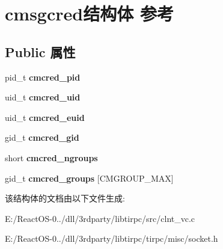 \hypertarget{structcmsgcred}{}\section{cmsgcred结构体 参考}
\label{structcmsgcred}
\subsection*{Public 属性}
\begin{DoxyCompactItemize}
\item 
\mbox{\label{structcmsgcred_a2bc7b741d972a1025be46ea13ea88811}} 
pid\+\_\+t {\bfseries cmcred\+\_\+pid}
\item 
\mbox{\label{structcmsgcred_a8bbd5df071d58f389356023b916c7b9c}} 
uid\+\_\+t {\bfseries cmcred\+\_\+uid}
\item 
\mbox{\label{structcmsgcred_ab81f4bcb1221a59cfea3417e1ac3874d}} 
uid\+\_\+t {\bfseries cmcred\+\_\+euid}
\item 
\mbox{\label{structcmsgcred_a2792ab4adb7f2b4ca200e99e2522b105}} 
gid\+\_\+t {\bfseries cmcred\+\_\+gid}
\item 
\mbox{\label{structcmsgcred_af807df1692434393dcb28acb7ace9e52}} 
short {\bfseries cmcred\+\_\+ngroups}
\item 
\mbox{\label{structcmsgcred_add9b9b6c20f69e7070e2b80951f639a7}} 
gid\+\_\+t {\bfseries cmcred\+\_\+groups} \mbox{[}C\+M\+G\+R\+O\+U\+P\+\_\+\+M\+AX\mbox{]}
\end{DoxyCompactItemize}


该结构体的文档由以下文件生成\+:\begin{DoxyCompactItemize}
\item 
E\+:/\+React\+O\+S-\/0../dll/3rdparty/libtirpc/src/clnt\+\_\+vc.\+c\item 
E\+:/\+React\+O\+S-\/0../dll/3rdparty/libtirpc/tirpc/misc/socket.\+h\end{DoxyCompactItemize}
